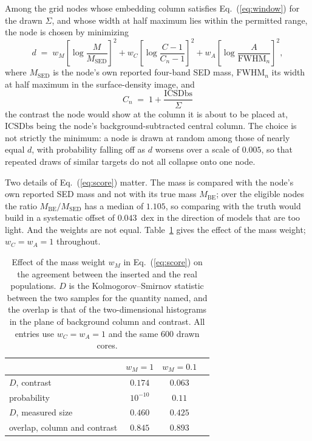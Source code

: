 \documentclass[11pt,a4paper]{article}
\begin{document}
Among the grid nodes whose embedding column satisfies Eq.~(\ref{eq:window})
for the drawn $\Sigma$, and whose width at half maximum lies within the
permitted range, the node is chosen by minimizing
\begin{equation}
  d \;=\; w_{M}\left[\log\frac{M}{M_{\mathrm{SED}}}\right]^{2}
        + w_{C}\left[\log\frac{C-1}{C_{n}-1}\right]^{2}
        + w_{A}\left[\log\frac{A}{\mathrm{FWHM}_{n}}\right]^{2},
  \label{eq:score}
\end{equation}
where $M_{\mathrm{SED}}$ is the node's own reported four-band SED mass,
$\mathrm{FWHM}_{n}$ its width at half maximum in the surface-density image, and
\begin{equation}
  C_{n} \;=\; 1 + \frac{\mathrm{ICSDbs}}{\Sigma}
\end{equation}
the contrast the node would show at the column it is about to be placed at,
$\mathrm{ICSDbs}$ being the node's background-subtracted central column. The
choice is not strictly the minimum: a node is drawn at random among those of
nearly equal $d$, with probability falling off as $d$ worsens over a scale of
$0.005$, so that repeated draws of similar targets do not all collapse onto
one node.

Two details of Eq.~(\ref{eq:score}) matter. The mass is compared with the
node's own reported SED mass and not with its true mass $M_{\mathrm{BE}}$;
over the eligible nodes the ratio $M_{\mathrm{BE}}/M_{\mathrm{SED}}$ has a
median of $1.105$, so comparing with the truth would build in a systematic
offset of $0.043$~dex in the direction of models that are too light. And the
weights are not equal. Table~\ref{tab:weights} gives the effect of the mass
weight; $w_{C}=w_{A}=1$ throughout.

\begin{table}
\centering
\caption{Effect of the mass weight $w_{M}$ in Eq.~(\ref{eq:score}) on the
agreement between the inserted and the real populations. $D$ is the
Kolmogorov--Smirnov statistic between the two samples for the quantity named,
and the overlap is that of the two-dimensional histograms in the plane of
background column and contrast. All entries use $w_{C}=w_{A}=1$ and the same
$600$ drawn cores.}
\label{tab:weights}
\begin{tabular}{lccc}
\hline\hline
 & $w_{M}=1$ & $w_{M}=0.1$ \\
\hline
$D$, contrast                & $0.174$ & $0.063$ \\
probability                  & $10^{-10}$ & $0.11$ \\
$D$, measured size           & $0.460$ & $0.425$ \\
overlap, column and contrast & $0.845$ & $0.893$ \\
\hline
\end{tabular}
\end{table}
\end{document}
